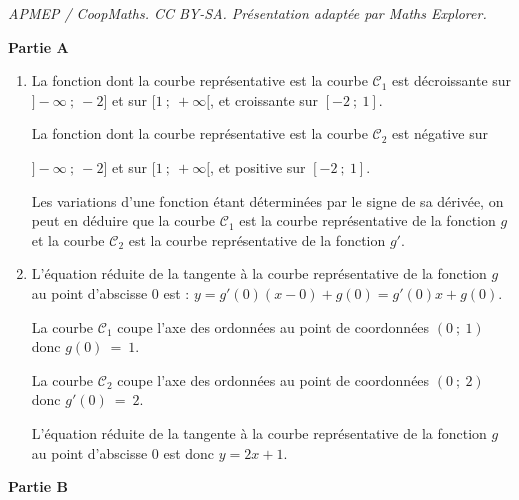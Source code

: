 \documentclass[10pt]{article}
\begin{document}
\noindent\textit{APMEP / CoopMaths. CC BY-SA. Présentation adaptée par Maths Explorer.}\par\medskip
\medskip

\textbf{Partie A}

\medskip



\begin{enumerate}
\item  La fonction dont la courbe représentative est la courbe $\mathcal{C}_{1}$ est décroissante sur $]-\infty~;~-2]$ et sur $[1~;~+\infty[$, et croissante sur $[-2~;~1]$.

La fonction dont la courbe représentative est la courbe $\mathcal{C}_{2}$ est négative sur

{$]-\infty~;~-2]$} et sur $[1~;~+\infty[$, et positive sur $[-2~;~1]$.

Les variations d'une fonction étant déterminées par le signe de sa dérivée, on peut en déduire que la courbe $\mathcal{C}_{1}$ est la courbe représentative de la fonction $g$ et la courbe $\mathcal{C}_{2}$ est la courbe représentative de la fonction $g'$. 


\item L'équation réduite de la tangente à la 
courbe représentative de la fonction $g$ au point d'abscisse 0 est : $y = g'(0)(x - 0)+ g(0)=g'(0)x+g(0)$.

La courbe $\mathcal{C}_{1}$ coupe l'axe des ordonnées au point de coordonnées $(0~;~1)$ donc $g(0)~=~1$.

La courbe $\mathcal{C}_{2}$ coupe l'axe des ordonnées au point de coordonnées $(0~;~2)$ donc $g'(0)~=~2$.

L'équation réduite de la tangente à la courbe représentative de la fonction $g$ au point d'abscisse 0 est donc $y = 2x+1$.
\end{enumerate}

\medskip

\textbf{Partie B}

\medskip
\end{document}

